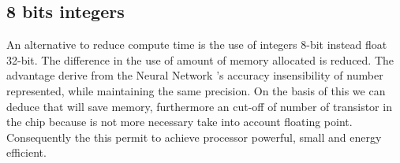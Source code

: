 \subsection{8 bits integers}
\label{ssec:8-bits.integers}
An alternative to reduce compute time is the use of integers 8-bit instead float
32-bit.
The difference in the use of amount of memory allocated is reduced.
The advantage derive from the Neural Network 's accuracy insensibility of number
represented, while maintaining the same precision. On the basis of this we can
deduce that will save memory, furthermore an cut-off of number of transistor in
the chip because is not more necessary take into account floating point.
Consequently the this permit to achieve processor powerful, small and energy
efficient.

